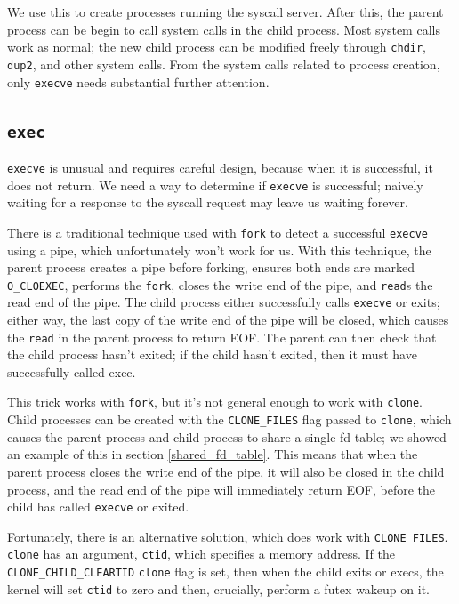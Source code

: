 \documentclass[letterpaper,twocolumn,10pt]{article}
\begin{document}
We use this to create processes running the syscall server.
After this,
the parent process can be begin to call system calls in the child process.
Most system calls work as normal;
the new child process can be modified freely through \texttt{chdir}, \texttt{dup2}, and other system calls.
From the system calls related to process creation,
only \texttt{execve} needs substantial further attention.
\subsection{\texttt{exec}}\label{execve}
\texttt{execve} is unusual and requires careful design,
because when it is successful, it does not return.
We need a way to determine if \texttt{execve} is successful;
naively waiting for a response to the syscall request may leave us waiting forever.

There is a traditional technique used with \texttt{fork}
to detect a successful \texttt{execve} using a pipe,
which unfortunately won't work for us.
With this technique, the parent process creates a pipe before forking,
ensures both ends are marked \verb|O_CLOEXEC|,
performs the \texttt{fork},
closes the write end of the pipe,
and \texttt{read}s the read end of the pipe.
The child process either successfully calls \texttt{execve} or exits;
either way, the last copy of the write end of the pipe will be closed,
which causes the \texttt{read} in the parent process to return EOF.
The parent can then check that the child process hasn't exited;
if the child hasn't exited, then it must have successfully called exec.

This trick works with \texttt{fork},
but it's not general enough to work with \texttt{clone}.
Child processes can be created with the \verb|CLONE_FILES| flag passed to \texttt{clone},
which causes the parent process and child process to share a single fd table;
we showed an example of this in section \ref{shared_fd_table}.
This means that when the parent process closes the write end of the pipe,
it will also be closed in the child process,
and the read end of the pipe will immediately return EOF,
before the child has called \texttt{execve} or exited.

Fortunately, there is an alternative solution, which does work with \verb|CLONE_FILES|.
\texttt{clone} has an argument, \texttt{ctid}, which specifies a memory address.
If the \verb|CLONE_CHILD_CLEARTID| \texttt{clone} flag is set,
then when the child exits or execs,
the kernel will set \texttt{ctid} to zero and then,
crucially, perform a futex wakeup on it\cite{clone}.
\end{document}
